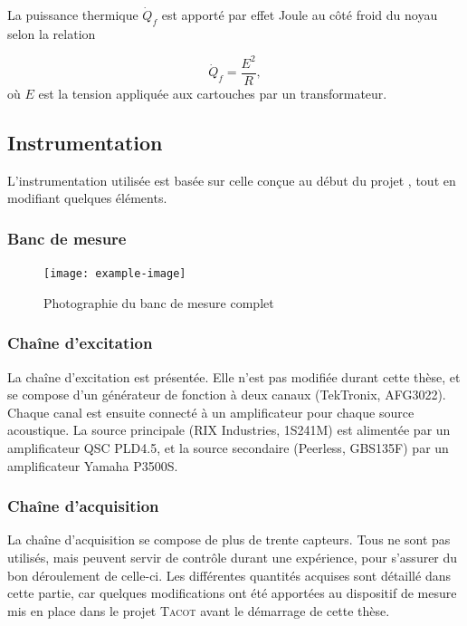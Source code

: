 La puissance thermique $\dot Q_f$ est apporté par effet Joule au côté froid du noyau selon la relation

\begin{equation}
	\dot Q_f = \frac{E^2}{R},
	\label{eq:Qf_Definition}
\end{equation}
où $E$ est la tension appliquée aux cartouches par un transformateur.

\subsection{Instrumentation}
L'instrumentation utilisée est basée sur celle conçue au début du projet \cite{ramadan_design_2021}, tout en modifiant quelques éléments.


\subsubsection{Banc de mesure}
\begin{figure}[!ht]
	\centering
%	
\texttt{[image: example-image]}
	\caption{Photographie du banc de mesure complet}
	\label{fig:BancMesureComplet}
\end{figure}



\subsubsection{Chaîne d'excitation}
La chaîne d'excitation est présentée. Elle n'est pas modifiée durant cette thèse, et se compose d'un générateur de fonction à deux canaux (TekTronix, AFG3022). Chaque canal est ensuite connecté à un amplificateur pour chaque source acoustique. La source principale (RIX Industries, 1S241M) est alimentée par un amplificateur QSC PLD4.5, et la source secondaire (Peerless, GBS135F) par un amplificateur Yamaha P3500S.\medskip


\subsubsection{Chaîne d'acquisition}
La chaîne d'acquisition se compose de plus de trente capteurs. Tous ne sont pas utilisés, mais peuvent servir de contrôle durant une expérience, pour s'assurer du bon déroulement de celle-ci. Les différentes quantités acquises sont détaillé dans cette partie, car quelques modifications ont été apportées au dispositif de mesure mis en place dans le projet \textsc{Tacot} avant le démarrage de cette thèse.

